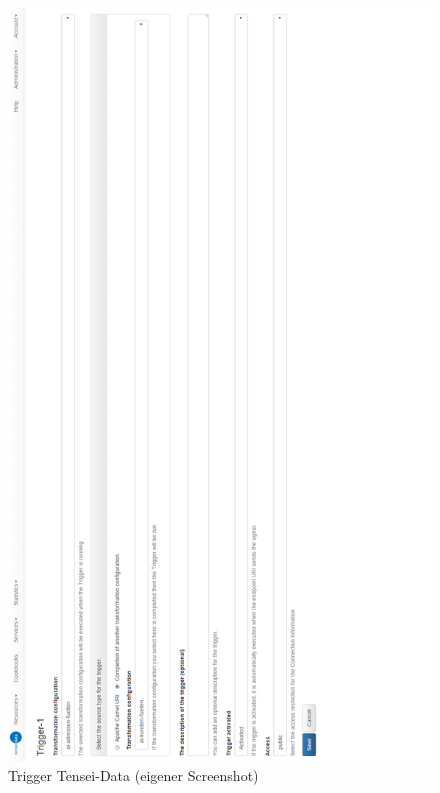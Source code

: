 \begin{figure}[ht]
	\begin{center}
		\includegraphics[scale=0.3]{bilder/trigger.png}
		\caption{Trigger Tensei-Data (eigener Screenshot)}
		\label{pic:trigger:Tensei}
	\end{center}
\end{figure}
